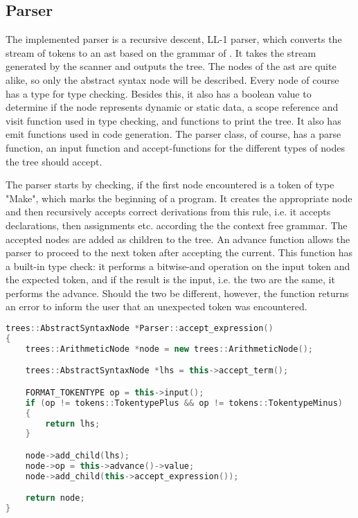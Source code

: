 \subsection{Parser}
The implemented parser is a recursive descent, LL-1 parser, which converts the stream of tokens to an \ac{ast} based on the grammar of \langname{}. It takes the stream generated by the scanner and outputs the tree.
\vspace{10pt}
The nodes of the \ac{ast} are quite alike, so only the abstract syntax node will be described. Every node of course has a type for type checking. Besides this, it also has a boolean value to determine if the node represents dynamic or static data, a scope reference and visit function used in type checking, and functions to print the tree. It also has emit functions used in code generation.
\vspace{10pt}
The parser class, of course, has a parse function, an input function and accept-functions for the different types of nodes the tree should accept.

The parser starts by checking, if the first node encountered is a token of type "Make", which marks the beginning of a program. It creates the appropriate node and then recursively accepts correct derivations from this rule, i.e. it accepts declarations, then assignments etc. according the the context free grammar. The accepted nodes are added as children to the tree. An advance function allows the parser to proceed to the next token after accepting the current. This function has a built-in type check: it performs a bitwise-and operation on the input token and the expected token, and if the result is the input, i.e. the two are the same, it performs the advance. Should the two be different, however, the function returns an error to inform the user that an unexpected token was encountered.

\begin{lstlisting}[language = c++]
trees::AbstractSyntaxNode *Parser::accept_expression()
{
	trees::ArithmeticNode *node = new trees::ArithmeticNode();

	trees::AbstractSyntaxNode *lhs = this->accept_term();

	FORMAT_TOKENTYPE op = this->input();
	if (op != tokens::TokentypePlus && op != tokens::TokentypeMinus)
	{
		return lhs;
	}

	node->add_child(lhs);
	node->op = this->advance()->value;
	node->add_child(this->accept_expression());

	return node;
}
\end{lstlisting}

